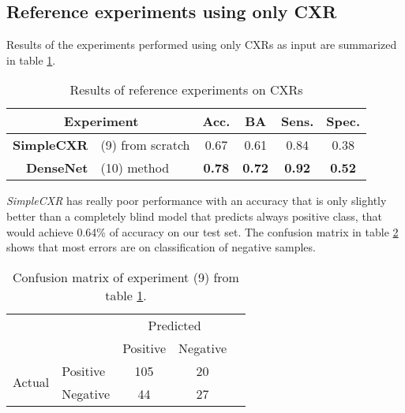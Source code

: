 \subsection{Reference experiments using only CXR}

Results of the experiments performed using only CXRs as input are summarized in table \ref{tab:cxr_baseline_results}.

\begin{table}
    \centering
    \begin{tabular}{|rl|c|c|c|c|}
        \hline
        \multicolumn{2}{|c|}{\textbf{Experiment}} & \textbf{Acc.} & \textbf{BA} & \textbf{Sens.} & \textbf{Spec.} \\
        \hline
        \textbf{SimpleCXR} & (9) from scratch               & 0.67          & 0.61          & 0.84          & 0.38          \\
        \hline
        \textbf{DenseNet}  & (10) method \cite{iodice_2022} & \textbf{0.78} & \textbf{0.72} & \textbf{0.92} & \textbf{0.52} \\
        \hline
    \end{tabular}
    \caption{Results of reference experiments on CXRs}
    \label{tab:cxr_baseline_results}
\end{table}

\emph{SimpleCXR} has really poor performance with an accuracy that is only slightly better than a completely blind model that predicts always positive class, that would achieve 0.64\% of accuracy on our test set.
The confusion matrix in table \ref{tab:confusion_matrix_simple_cxr} shows that most errors are on classification of negative samples.

\begin{table}[h]
    \centering
    \begin{tabular}{l|l|c|c|c}
        \multicolumn{2}{c}{}&\multicolumn{2}{c}{Predicted} & \hspace{2.5em} \\
        \cline{3-4}
        \multicolumn{2}{c|}{}& Positive & Negative & \\
        \cline{2-4}
        \multirow{2}{*}{Actual}& Positive & 105 & 20 & \\
        \cline{2-4}
        & Negative & 44 & 27 & \\
        \cline{2-4}
    \end{tabular}
    \caption{Confusion matrix of experiment (9) from table \ref{tab:cxr_baseline_results}.}
    \label{tab:confusion_matrix_simple_cxr}
\end{table}

